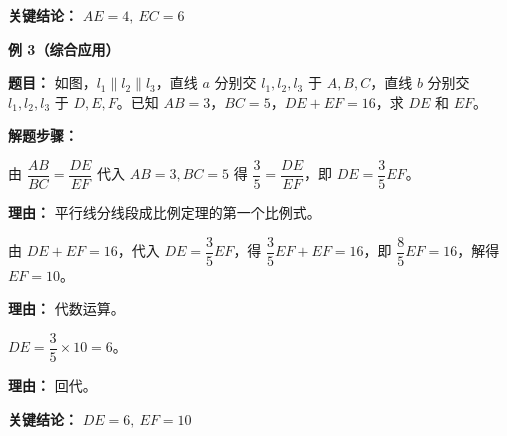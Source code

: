 \begin{examplebox}
	\textbf{\textcolor{CExample}{关键结论：}}
	\textbf{$\boxed{AE=4,\ EC=6}$}

	\medskip
	\textbf{\textcolor{CExample}{例 3（综合应用）}}

	\textbf{\textcolor{CExample}{题目：}}
	如图，$l_1\parallel l_2\parallel l_3$，直线 $a$ 分别交 $l_1,l_2,l_3$ 于 $A,B,C$，直线 $b$ 分别交 $l_1,l_2,l_3$ 于 $D,E,F$。已知 $AB=3$，$BC=5$，$DE+EF=16$，求 $DE$ 和 $EF$。

	\textbf{\textcolor{CExample}{解题步骤：}}
	\begin{description}[style=nextline, leftmargin=2.8em, labelsep=0.5em, itemsep=0.45em]
		\item[\textbf{第一步（列比例式）：}] 由 $\dfrac{AB}{BC}=\dfrac{DE}{EF}$ 代入 $AB=3,BC=5$ 得 $\dfrac{3}{5}=\dfrac{DE}{EF}$，即 $DE=\dfrac{3}{5}EF$。
			\par\textbf{理由：}
			平行线分线段成比例定理的第一个比例式。
		\item[\textbf{第二步（利用和条件）：}] 由 $DE+EF=16$，代入 $DE=\dfrac{3}{5}EF$，得 $\dfrac{3}{5}EF+EF=16$，即 $\dfrac{8}{5}EF=16$，解得 $EF=10$。
			\par\textbf{理由：}
			代数运算。
		\item[\textbf{第三步（求 DE）：}] $DE=\dfrac{3}{5}\times10=6$。
			\par\textbf{理由：}
			回代。
	\end{description}

	\textbf{\textcolor{CExample}{关键结论：}}
	\textbf{$\boxed{DE=6,\ EF=10}$}
\end{examplebox}
